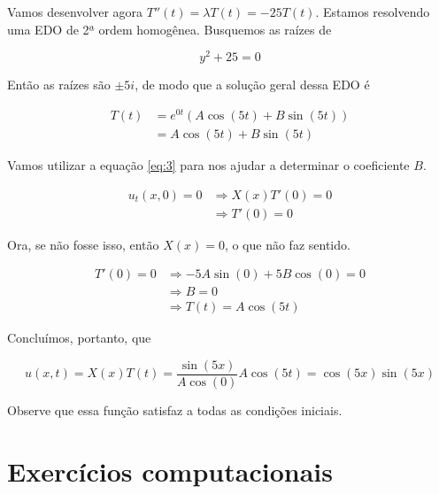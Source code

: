 \documentclass{article}
\begin{document}
\begin{enumerate}
                Vamos desenvolver agora $T''(t) = \lambda T(t) = -25 T(t)$.
                Estamos resolvendo uma EDO de 2ª ordem homogênea. Busquemos as raízes de

                $$y^2+25 = 0$$

                Então as raízes são $\pm 5i$, de modo que a solução geral dessa EDO é

                \begin{align*}
                    T(t) &= e^{0t} (A \cos(5t) + B\sin(5t)) \\
                    &= A \cos(5t) + B\sin(5t)
                \end{align*}

                Vamos utilizar a equação \ref{eq:3} para nos ajudar a determinar o coeficiente $B$.
                
                \begin{align*}
                    u_t(x, 0) = 0 &\Rightarrow X(x) T'(0) = 0 \\
                    &\Rightarrow T'(0) = 0
                \end{align*}

                Ora, se não fosse isso, então $X(x) = 0$, o que não faz sentido.

                \begin{align*}
                    T'(0) = 0 &\Rightarrow -5A \sin(0) + 5B\cos(0) = 0 \\
                    &\Rightarrow B = 0 \\
                    &\Rightarrow T(t) = A \cos(5t)
                \end{align*}

                Concluímos, portanto, que

                $$u(x, t) = X(x)T(t) = \dfrac{\sin(5x)}{A \cos(0)}A \cos(5t) = \cos(5x)\sin(5x)$$

                Observe que essa função satisfaz a todas as condições iniciais.
        \end{enumerate}

    \section*{Exercícios computacionais}
\end{document}
